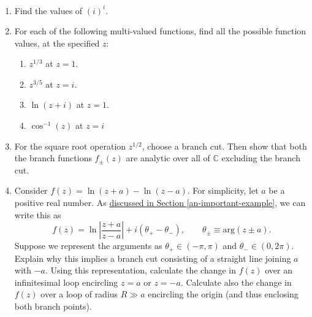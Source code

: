 \documentclass[10pt,a4paper]{article}
\begin{document}
\begin{enumerate}
\item
Find the values of $(i)^i$.

\item
For each of the following multi-valued functions, find all the possible
function values, at the specified $z$:

\begin{enumerate}
\item $z^{1/3}$ at $z = 1$.
\item $z^{3/5}$ at $z = i$.
\item $\ln(z+i)$ at $z = 1$.
\item $\cos^{-1}(z)$ at $z = i$
\end{enumerate}

\item
For the square root operation $z^{1/2}$, choose a branch cut. Then
show that both the branch functions $f_\pm(z)$ are analytic over all
of $\mathbb{C}$ excluding the branch cut.

\item
Consider $f(z) = \ln(z+a) - \ln(z-a)$. For simplicity, let $a$ be a
positive real number. As \hyperref[an-important-example]{discussed in
  Section \ref{an-important-example}}, we can write this as
\begin{equation}
  f(z) = \ln\left|\frac{z+a}{z-a}\right|
  + i(\theta_+ - \theta_-), \qquad \theta_\pm \equiv \mathrm{arg}(z\pm a).
\end{equation}
Suppose we represent the arguments as $\theta_+ \in (-\pi,\pi)$ and
$\theta_- \in (0,2\pi)$. Explain why this implies a branch cut
consisting of a straight line joining $a$ with $-a$. Using this
representation, calculate the change in $f(z)$ over an infinitesimal
loop encircling $z = a$ or $z = -a$. Calculate also the change in
$f(z)$ over a loop of radius $R \gg a$ encircling the origin (and thus
enclosing both branch points).
\end{enumerate}
    
\end{document}

